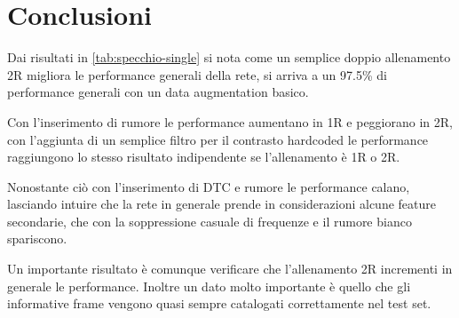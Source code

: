 \chapter{Conclusioni}\label{conclusioni}

Dai risultati in \cref{tab:specchio-single} si  nota come un semplice doppio allenamento 2R migliora le performance generali della rete, si arriva a un 97.5\% di performance generali con un data augmentation basico. 

Con l'inserimento di rumore le performance aumentano in 1R e peggiorano in 2R, con l'aggiunta di un semplice filtro per il contrasto hardcoded le performance raggiungono lo stesso risultato indipendente se l'allenamento è 1R o 2R.

Nonostante ciò con l'inserimento di DTC e rumore le performance calano, lasciando intuire che la rete in generale prende in considerazioni alcune feature secondarie, che con la soppressione casuale di frequenze e il rumore bianco spariscono.

Un importante risultato è comunque verificare che l'allenamento 2R incrementi in generale le performance. Inoltre un dato molto importante è  quello che gli informative frame vengono quasi sempre catalogati correttamente nel test set.